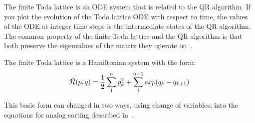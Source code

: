 The finite Toda lattice is an ODE system that is related to the QR algorithm.
If you plot the evolution of the Toda lattice ODE with respect to time, the values of the ODE at integer time steps is the intermediate states of the QR algorithm.
The common property of the finite Toda lattice and the QR algorithm is that both preserve the eigenvalues of the matrix they operate on~\cite{bloch}.

The finite Toda lattice is a Hamiltonian system with the form:
\[ \hat{\mathcal{H}}(p,q) = \frac{1}{2} \sum^{n}_{1}p_k^2 + \sum^{n-1}_{1}exp(q_k-q_{k+1})\]

This basic form can changed in two ways, using change of variables, into the equations for analog sorting described in~\cite{brockett}.






